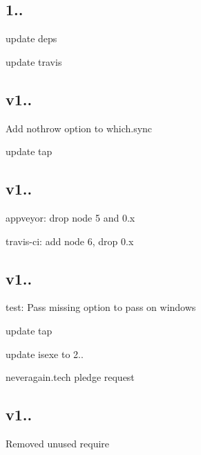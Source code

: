 \subsection*{1..}


\begin{DoxyItemize}
\item update deps
\item update travis
\end{DoxyItemize}

\subsection*{v1..}


\begin{DoxyItemize}
\item Add nothrow option to which.\+sync
\item update tap
\end{DoxyItemize}

\subsection*{v1..}


\begin{DoxyItemize}
\item appveyor\+: drop node 5 and 0.\+x
\item travis-\/ci\+: add node 6, drop 0.\+x
\end{DoxyItemize}

\subsection*{v1..}


\begin{DoxyItemize}
\item test\+: Pass missing option to pass on windows
\item update tap
\item update isexe to 2..
\item neveragain.\+tech pledge request
\end{DoxyItemize}

\subsection*{v1..}


\begin{DoxyItemize}
\item Removed unused require
\end{DoxyItemize}

